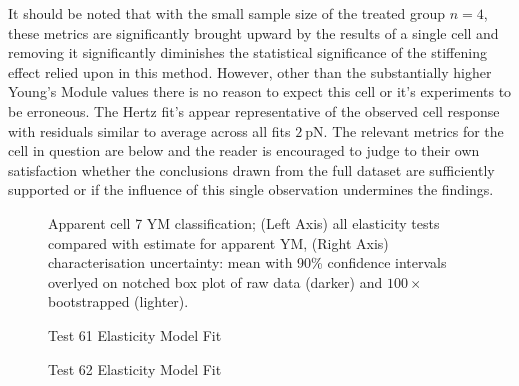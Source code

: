 \documentclass[
  paper=a4,
  ,captions=tableheading
]{scrartcl}
\makeatletter
\newcommand*\pandocbounded[1]{%
  \sbox\pandoc@box{#1}%
  \Gscale@div\@tempa{\textheight}{\dimexpr\ht\pandoc@box+\dp\pandoc@box\relax}%
  \Gscale@div\@tempb{\linewidth}{\wd\pandoc@box}%
  \ifdim\@tempb\p@<\@tempa\p@\let\@tempa\@tempb\fi%
  \ifdim\@tempa\p@<\p@\scalebox{\@tempa}{\usebox\pandoc@box}%
  \else\usebox{\pandoc@box}%
  \fi%
}
\makeatother
\begin{document}
It should be noted that with the small sample size of the treated group
\(n=4\), these metrics are significantly brought upward by the results
of a single cell and removing it significantly diminishes the
statistical significance of the stiffening effect relied upon in this
method. However, other than the substantially higher Young's Module
values there is no reason to expect this cell or it's experiments to be
erroneous. The Hertz fit's appear representative of the observed cell
response with residuals similar to average across all fits
\(2 \ \text{pN}\). The relevant metrics for the cell in question are
below and the reader is encouraged to judge to their own satisfaction
whether the conclusions drawn from the full dataset are sufficiently
supported or if the influence of this single observation undermines the
findings.

\begin{figure}
\centering
\pandocbounded{}
\caption{Apparent cell 7 YM classification; (Left Axis) all elasticity
tests compared with estimate for apparent YM, (Right Axis)
characterisation uncertainty: mean with 90\% confidence intervals
overlyed on notched box plot of raw data (darker) and \(100 \times\)
bootstrapped (lighter).}
\end{figure}

\noindent
\begin{minipage}[t]{0.48\textwidth}
\begin{figure}
\centering
\pandocbounded{}
\caption{Test 61 Elasticity Model Fit}
\end{figure}
\end{minipage}
\hfill
\begin{minipage}[t]{0.48\textwidth}
\begin{figure}
\centering
\pandocbounded{}
\caption{Test 62 Elasticity Model Fit}
\end{figure}
\end{minipage}
\end{document}
